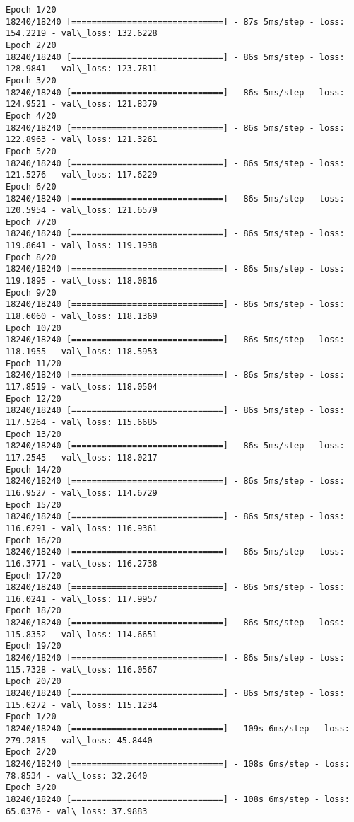 \documentclass[11pt]{article}
\begin{document}
    \begin{Verbatim}[commandchars=\\\{\}]
Epoch 1/20
18240/18240 [==============================] - 87s 5ms/step - loss: 154.2219 - val\_loss: 132.6228
Epoch 2/20
18240/18240 [==============================] - 86s 5ms/step - loss: 128.9841 - val\_loss: 123.7811
Epoch 3/20
18240/18240 [==============================] - 86s 5ms/step - loss: 124.9521 - val\_loss: 121.8379
Epoch 4/20
18240/18240 [==============================] - 86s 5ms/step - loss: 122.8963 - val\_loss: 121.3261
Epoch 5/20
18240/18240 [==============================] - 86s 5ms/step - loss: 121.5276 - val\_loss: 117.6229
Epoch 6/20
18240/18240 [==============================] - 86s 5ms/step - loss: 120.5954 - val\_loss: 121.6579
Epoch 7/20
18240/18240 [==============================] - 86s 5ms/step - loss: 119.8641 - val\_loss: 119.1938
Epoch 8/20
18240/18240 [==============================] - 86s 5ms/step - loss: 119.1895 - val\_loss: 118.0816
Epoch 9/20
18240/18240 [==============================] - 86s 5ms/step - loss: 118.6060 - val\_loss: 118.1369
Epoch 10/20
18240/18240 [==============================] - 86s 5ms/step - loss: 118.1955 - val\_loss: 118.5953
Epoch 11/20
18240/18240 [==============================] - 86s 5ms/step - loss: 117.8519 - val\_loss: 118.0504
Epoch 12/20
18240/18240 [==============================] - 86s 5ms/step - loss: 117.5264 - val\_loss: 115.6685
Epoch 13/20
18240/18240 [==============================] - 86s 5ms/step - loss: 117.2545 - val\_loss: 118.0217
Epoch 14/20
18240/18240 [==============================] - 86s 5ms/step - loss: 116.9527 - val\_loss: 114.6729
Epoch 15/20
18240/18240 [==============================] - 86s 5ms/step - loss: 116.6291 - val\_loss: 116.9361
Epoch 16/20
18240/18240 [==============================] - 86s 5ms/step - loss: 116.3771 - val\_loss: 116.2738
Epoch 17/20
18240/18240 [==============================] - 86s 5ms/step - loss: 116.0241 - val\_loss: 117.9957
Epoch 18/20
18240/18240 [==============================] - 86s 5ms/step - loss: 115.8352 - val\_loss: 114.6651
Epoch 19/20
18240/18240 [==============================] - 86s 5ms/step - loss: 115.7328 - val\_loss: 116.0567
Epoch 20/20
18240/18240 [==============================] - 86s 5ms/step - loss: 115.6272 - val\_loss: 115.1234
Epoch 1/20
18240/18240 [==============================] - 109s 6ms/step - loss: 279.2815 - val\_loss: 45.8440
Epoch 2/20
18240/18240 [==============================] - 108s 6ms/step - loss: 78.8534 - val\_loss: 32.2640
Epoch 3/20
18240/18240 [==============================] - 108s 6ms/step - loss: 65.0376 - val\_loss: 37.9883

\end{Verbatim}
\end{document}
